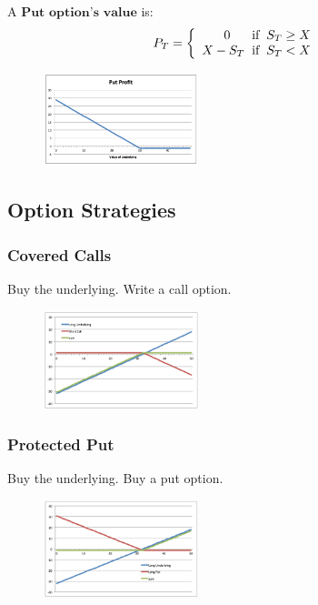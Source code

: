 \begin{multicols}{2}
A $\boxed{\textbf{Put option's value}}$ is:
\begin{gather*}
    P_T=\left\{
        \begin{array}{ll}
            \begin{split}
                0\hspace*{0.6cm}&\text{if}\hspace*{0.2cm}S_T\geq X\\
                X-S_T\hspace*{0.2cm}&\text{if}\hspace*{0.2cm}S_T< X\\
            \end{split}
        \end{array}
        \right.
\end{gather*}
\begin{figure}[H]
    \centering 
    \includegraphics[width =0.4\textwidth]{Figure/put.png}
\end{figure}

\subsection{Option Strategies}
\subsubsection{Covered Calls}
Buy the underlying. Write a call option.
\begin{figure}[H]
    \centering 
    \includegraphics[width =0.4\textwidth]{Figure/cover_call.png}
\end{figure}

\subsubsection{Protected Put}
Buy the underlying. Buy a put option.
\begin{figure}[H]
    \centering 
    \includegraphics[width =0.4\textwidth]{Figure/protect_put.png}
\end{figure}


\end{multicols}
